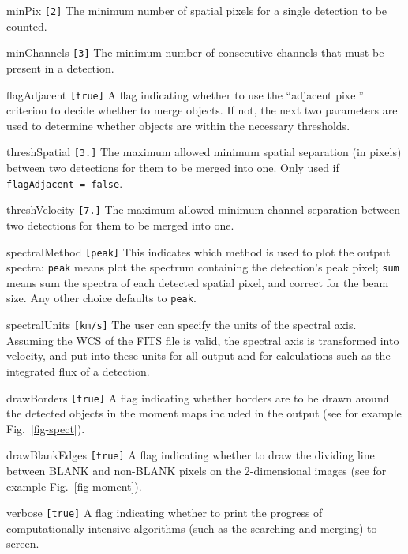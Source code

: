 \begin{entry}
\item[minPix \texttt{[2]}] The minimum number of spatial pixels for a
  single detection to be counted.
\item[minChannels \texttt{[3]}] The minimum number of consecutive
  channels that must be present in a detection.
\item[flagAdjacent \texttt{[true]}] A flag indicating whether to use
  the ``adjacent pixel'' criterion to decide whether to merge
  objects. If not, the next two parameters are used to determine
  whether objects are within the necessary thresholds.
\item[threshSpatial \texttt{[3.]}] The maximum allowed minimum spatial
  separation (in pixels) between two detections for them to be merged
  into one. Only used if \texttt{flagAdjacent = false}.
\item[threshVelocity \texttt{[7.]}] The maximum allowed minimum channel
  separation between two detections for them to be merged into
  one. 
\end{entry}

\begin{entry}
\item[spectralMethod \texttt{[peak]}] This indicates which method is used
  to plot the output spectra: \texttt{peak} means plot the spectrum
  containing the detection's peak pixel; \texttt{sum} means sum the
  spectra of each detected spatial pixel, and correct for the beam
  size. Any other choice defaults to \texttt{peak}.
\item[spectralUnits \texttt{[km/s]}] The user can specify the units of
  the spectral axis. Assuming the WCS of the FITS file is valid, the
  spectral axis is transformed into velocity, and put into these units
  for all output and for calculations such as the integrated flux of a
  detection.
\item[drawBorders \texttt{[true]}] A flag indicating whether borders
  are to be drawn around the detected objects in the moment maps
  included in the output (see for example Fig.~\ref{fig-spect}).
\item[drawBlankEdges \texttt{[true]}] A flag indicating whether to
 draw the dividing line between BLANK and non-BLANK pixels on the
 2-dimensional images (see for example Fig.~\ref{fig-moment}).
\item[verbose \texttt{[true]}] A flag indicating whether to print the
  progress of computationally-intensive algorithms (such as the
  searching and merging) to screen.
\end{entry}

